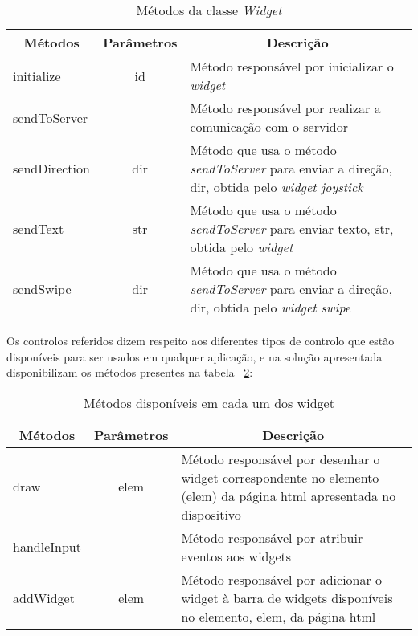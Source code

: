 	\begin{table}[ht]
 	\renewcommand{\arraystretch}{1.5}
	\centering

	\begin{tabular}{ p{2cm} p{2cm} p{10cm}  }
	\multicolumn{1}{c}{\textbf{Métodos}} & \multicolumn{1}{c}{\textbf{Parâmetros}} & \multicolumn{1}{c}{\textbf{Descrição}} \\
	\hline
	initialize & \multicolumn{1}{c}{id} &Método responsável por inicializar o \textit{widget} \\
	\hline
	sendToServer & \multicolumn{1}{c}{} &Método responsável por realizar a comunicação com o servidor \\
	\hline
	sendDirection & \multicolumn{1}{c}{dir} &Método que usa o método \textit{sendToServer} para enviar a direção, dir, obtida pelo \textit{widget joystick} \\
	\hline
	sendText & \multicolumn{1}{c}{str} &Método que usa o método \textit{sendToServer} para enviar texto, str, obtida pelo \textit{widget}  \\
	\hline
	sendSwipe & \multicolumn{1}{c}{dir} &Método que usa o método \textit{sendToServer} para enviar a direção, dir, obtida pelo \textit{widget swipe}  \\
	\hline
	\end{tabular}
	\caption{Métodos da classe \textit{Widget}}
	\label{table:widget_met}
	\end{table}
	
	Os controlos referidos dizem respeito aos diferentes tipos de controlo que estão disponíveis para ser usados em qualquer aplicação, e na solução apresentada disponibilizam os métodos presentes na tabela ~\ref{table:metodos}:
	
 	\begin{table}[ht]
 	\renewcommand{\arraystretch}{1.5}
	\centering

	\begin{tabular}{ p{2cm} p{2cm} p{10cm}  }
	\multicolumn{1}{c}{\textbf{Métodos}} & \multicolumn{1}{c}{\textbf{Parâmetros}} & \multicolumn{1}{c}{\textbf{Descrição}} \\
	\hline
	draw & \multicolumn{1}{c}{elem} &Método responsável por desenhar o widget correspondente no elemento (elem) da página html apresentada no dispositivo \\
	\hline
	handleInput & \multicolumn{1}{c}{} &Método responsável por atribuir eventos aos widgets \\
	\hline
	addWidget & \multicolumn{1}{c}{elem} &Método responsável por adicionar o widget à barra de widgets disponíveis no elemento, elem, da página html \\
	\hline
	\end{tabular}
	\caption{Métodos disponíveis em cada um dos widget}
	\label{table:metodos}
	\end{table}


